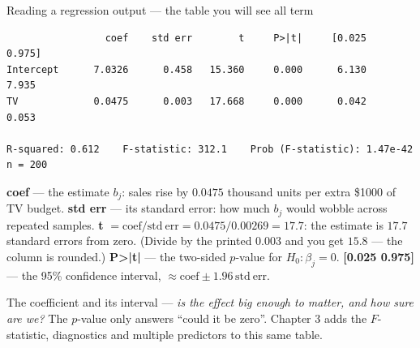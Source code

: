 \documentclass[aspectratio=169,11pt]{beamer}
\begin{document}
\begin{frame}[fragile]{Reading a regression output --- the table you will see all term}\label{frm:regtable}
  \scriptsize
\begin{lstlisting}
                 coef    std err        t     P>|t|     [0.025    0.975]
Intercept      7.0326      0.458   15.360     0.000      6.130     7.935
TV             0.0475      0.003   17.668     0.000      0.042     0.053

R-squared: 0.612    F-statistic: 312.1    Prob (F-statistic): 1.47e-42    n = 200
\end{lstlisting}
  \begin{readme}
    \textbf{coef} --- the estimate $b_j$: sales rise by $0.0475$ thousand
    units per extra \$1000 of TV budget.
    \textbf{std err} --- its standard error: how much $b_j$ would wobble
    across repeated samples.
    \textbf{t} $= \mathrm{coef}/\mathrm{std\ err} = 0.0475/0.00269 = 17.7$:
    the estimate is $17.7$ standard errors from zero. (Divide by the printed
    $0.003$ and you get $15.8$ --- the column is rounded.)
    \textbf{P>|t|} --- the two-sided $p$-value for $H_0:\beta_j = 0$.
    \textbf{[0.025 0.975]} --- the 95\% confidence interval, $\approx
    \mathrm{coef} \pm 1.96\,\mathrm{std\ err}$.
  \end{readme}
  \begin{takeaway}
    The coefficient and its interval --- \emph{is the effect big enough to
    matter, and how sure are we?} The $p$-value only answers ``could it be
    zero''. Chapter 3 adds the $F$-statistic, diagnostics and multiple
    predictors to this same table.
  \end{takeaway}
\end{frame}
\end{document}

